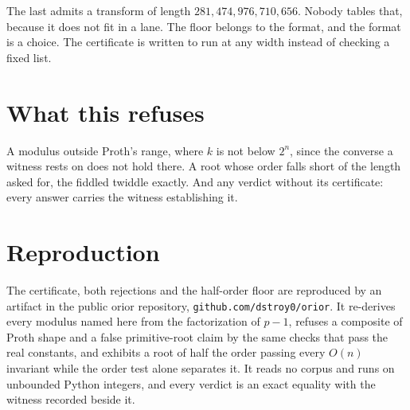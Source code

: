 \documentclass{article}
\begin{document}
The last admits a transform of length \(281{,}474{,}976{,}710{,}656\). Nobody tables that, because it does not fit in a lane. The floor belongs to the format, and the format is a choice. The certificate is written to run at any width instead of checking a fixed list.

\section{What this refuses}

A modulus outside Proth's range, where \(k\) is not below \(2^n\), since the converse a witness rests on does not hold there. A root whose order falls short of the length asked for, the fiddled twiddle exactly. And any verdict without its certificate: every answer carries the witness establishing it.

\section{Reproduction}

The certificate, both rejections and the half-order floor are reproduced by an artifact in the public orior repository, \texttt{github.com/dstroy0/orior}. It re-derives every modulus named here from the factorization of \(p-1\), refuses a composite of Proth shape and a false primitive-root claim by the same checks that pass the real constants, and exhibits a root of half the order passing every \(O(n)\) invariant while the order test alone separates it. It reads no corpus and runs on unbounded Python integers, and every verdict is an exact equality with the witness recorded beside it.
\end{document}
